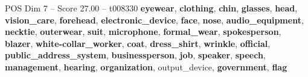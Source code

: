 \begin{textsample}{POS Dim 7 – Score 27.00 – t008330}  \label{ex:f7_pos_028}
\textbf{eyewear}, \textbf{clothing}, \textbf{chin}, \textbf{glasses}, \textbf{head}, \textbf{vision\_care}, \textbf{forehead}, \textbf{electronic\_device}, \textbf{face}, \textbf{nose}, \textbf{audio\_equipment}, \textbf{necktie}, \textbf{outerwear}, \textbf{suit}, \textbf{microphone}, \textbf{formal\_wear}, \textbf{spokesperson}, \textbf{blazer}, \textbf{white-collar\_worker}, \textbf{coat}, \textbf{dress\_shirt}, \textbf{wrinkle}, \textbf{official}, \textbf{public\_address\_system}, \textbf{businessperson}, \textbf{job}, \textbf{speaker}, \textbf{speech}, \textbf{management}, \textbf{hearing}, \textbf{organization}, output\_device, \textbf{government}, \textbf{flag}

\end{textsample}
